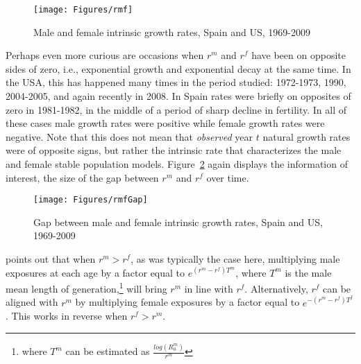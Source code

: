 \begin{figure}[ht!]
        \centering  
          \caption{Male and female intrinsic growth rates, Spain and US,
          1969-2009}
           \texttt{[image: Figures/rmf]}
          \label{fig:rmf}
\end{figure}

Perhaps even more curious are occasions when $r^m$ and $r^f$ have been on
opposite sides of zero, i.e., exponential growth and exponential decay at the
same time. In the USA, this has happened many times in the period studied:
1972-1973, 1990, 2004-2005, and again recently in 2008. In Spain rates were 
briefly on opposites of zero in 1981-1982, in the middle of a period of sharp
decline in fertility. In all of these cases male growth rates were positive
while female growth rates were negative. Note that this does not mean that 
\textit{observed} year $t$ natural growth rates were of opposite signs, but
rather the intrinsic rate that characterizes the male and female stable
population models.
Figure~\ref{fig:rmfGap} again displays the information of interest, the size 
of the gap between $r^m$ and $r^f$ over time.

\begin{figure}[ht!]
        \centering  
          \caption{Gap between male and female intrinsic growth rates, Spain and
          US, 1969-2009}
           \texttt{[image: Figures/rmfGap]}
          \label{fig:rmfGap}
\end{figure}
\label{par:coalermrf}
\citet[p. 57]{coale1972growth} points out that when $r^m > r^f$, as was
typically the case here, multiplying male exposures at each age by a factor equal to
$e^{(r^m - r^f)T^m}$, where $T^m$ is the male mean length of
generation,\footnote{where $T^m$ can be estimated as
$\frac{log(R_0^m)}{r^m}$} will bring $r^m$ in line with $r^f$. Alternatively,
$r^f$ can be aligned with $r^m$ by multiplying female exposures by a factor equal
 to $e^{-(r^m - r^f)T^f}$. This works in reverse when $r^f > r^m$.

 \FloatBarrier
